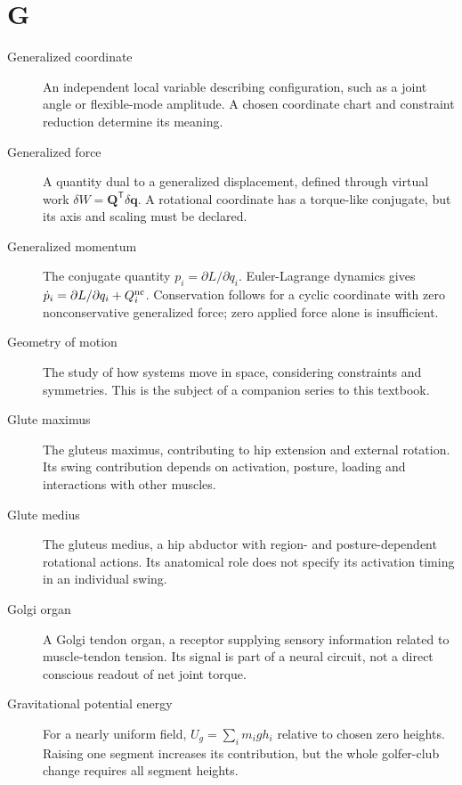 \section*{G}
\begin{description}

\item[Generalized coordinate] An independent local variable describing configuration, such as a joint angle or flexible-mode amplitude. A chosen coordinate chart and constraint reduction determine its meaning.

\item[Generalized force] A quantity dual to a generalized displacement, defined through virtual work $\delta W=\mathbf{Q}^\mathsf{T}\delta\mathbf{q}$. A rotational coordinate has a torque-like conjugate, but its axis and scaling must be declared.

\item[Generalized momentum] The conjugate quantity $p_i=\partial L/\partial\dot q_i$. Euler-Lagrange dynamics gives $\dot p_i=\partial L/\partial q_i+Q_i^{\rm nc}$. Conservation follows for a cyclic coordinate with zero nonconservative generalized force; zero applied force alone is insufficient.

\item[Geometry of motion] The study of how systems move in space, considering constraints and symmetries. This is the subject of a companion series to this textbook.

\item[Glute maximus] The gluteus maximus, contributing to hip extension and external rotation. Its swing contribution depends on activation, posture, loading and interactions with other muscles.

\item[Glute medius] The gluteus medius, a hip abductor with region- and posture-dependent rotational actions. Its anatomical role does not specify its activation timing in an individual swing.

\item[Golgi organ] A Golgi tendon organ, a receptor supplying sensory information related to muscle-tendon tension. Its signal is part of a neural circuit, not a direct conscious readout of net joint torque.

\item[Gravitational potential energy] For a nearly uniform field, $U_g=\sum_i m_i g h_i$ relative to chosen zero heights. Raising one segment increases its contribution, but the whole golfer-club change requires all segment heights.


\end{description}
